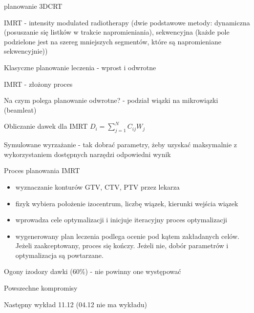 \documentclass{article}
\begin{document}
planowanie 3DCRT

IMRT - intensity modulated radiotherapy (dwie podstawowe metody: dynamiczna (posuszanie się listków w trakcie napromieniania), sekwencyjna (każde pole podzielone jest na szereg mniejszych segmentów, które są napromieniane sekwencyjnie))

Klasyczne planowanie leczenia - wprost i odwrotne

IMRT - złożony proces

Na czym polega planowanie odwrotne? - podział wiązki na mikrowiązki (beamleat)

Obliczanie dawek dla IMRT $D_i = \sum_{j=1}^{N}C_{ij}W_j$

Symulowane wyrzażanie - tak dobrać parametry, żeby uzyskać maksymalnie z wykorzystaniem dostępnych narzędzi odpowiedni wynik

Proces planowania IMRT
\begin{itemize}
    \item wyznaczanie konturów GTV, CTV, PTV przez lekarza
    \item fizyk wybiera położenie izocentrum, liczbę wiązek, kierunki wejścia wiązek
    \item wprowadza cele optymalizacji i inicjuje iteracyjny proces optymalizacji
    \item wygenerowany plan leczenia podlega ocenie pod kątem zakładanych celów. Jeżeli zaakceptowany, proces się kończy. Jeżeli nie, dobór parametrów i optymalizacja są powtarzane.
\end{itemize}

Ogony izodozy dawki (60\%) - nie powinny one występować

Powszechne kompromisy

Następny wykład 11.12 (04.12 nie ma wykładu)
\end{document}
